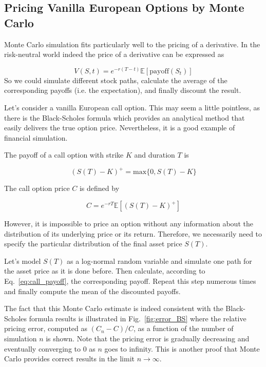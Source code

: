 \subsection{Pricing Vanilla European Options by Monte Carlo}
Monte Carlo simulation fits particularly well to the pricing of a derivative. In the risk-neutral world indeed the price of a derivative can be expressed as

\begin{equation}
V(S, t) = e^{-r(T-t)} \mathbb{E}[\textrm{payoff}(S_t)]
\end{equation}
So we could simulate different stock paths, calculate the average of the corresponding payoffs (i.e. the expectation), and finally discount the result.

Let's consider a vanilla European call option. This may seem a little pointless, as there is the Black-Scholes formula which provides an analytical method that easily delivers the true option price. Nevertheless, it is a good example of financial simulation. 

The payoff of a call option with strike $K$ and duration $T$ is 

\begin{equation}
(S(T)−K)^+ = \textrm{max}\{0,S(T)−K\}
\end{equation}

The call option price $C$ is defined by

\begin{equation} 
C = e^{−rT} \mathbb{E}[(S(T) −K)^+ ]
\label{eq:call_payoff}
\end{equation}

However, it is impossible to price an option without any information about the distribution of its underlying price or its return. Therefore, we necessarily need to specify the particular distribution of the final asset price $S(T)$. 

Let's model $S(T)$ as a log-normal random variable and simulate one path for the asset price as it is done before. Then calculate, according to Eq.~\ref{eq:call_payoff}, the corresponding payoff. Repeat this step numerous times and finally compute the mean of the discounted payoffs. 

The fact that this Monte Carlo estimate is indeed consistent with the Black-Scholes formula results is illustrated in Fig.~\ref{fig:error_BS} where the relative pricing error, computed as $(C_n − C)/C$, as a function of the number of simulation $n$ is shown. Note that the pricing error is gradually decreasing and eventually converging to 0 as $n$ goes to infinity. This is another proof that Monte Carlo provides correct results in the limit $n\rightarrow\infty$.

